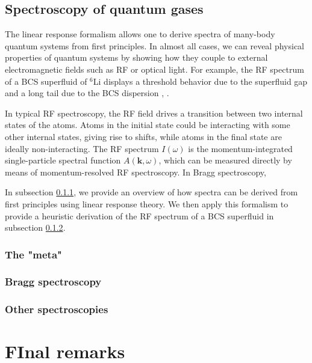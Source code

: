 \documentclass[reprint,
nofootinbib,
amsmath,amssymb,
aps]{revtex4-1}
\begin{document}
\subsection{Spectroscopy of quantum gases}\label{sec:spec}

The linear response formalism allows one to derive spectra of many-body quantum systems from first principles. In almost all cases, we can reveal physical properties of quantum systems by showing how they couple to external electromagnetic fields such as RF or optical light. For example, the RF spectrum of a BCS superfluid of $^6$Li displays a threshold behavior due to the superfluid gap and a long tail due to the BCS dispersion \cite{schirotzek2008determination}, \cite{torma2014quantum}. 

In typical RF spectroscopy, the RF field drives a transition between two internal states of the atoms. Atoms in the initial state could be interacting with some other internal states, giving rise to shifts, while atoms in the final state are ideally non-interacting. The RF spectrum $I(\omega)$ is the momentum-integrated single-particle spectral function $A(\mathbf{k}, \omega)$, which can be measured directly by means of momentum-resolved RF spectroscopy. In Bragg spectroscopy, 

In subsection \ref{sec:method}, we provide an overview of how spectra can be derived from first principles using linear response theory. We then apply this formalism to provide a heuristic derivation of the RF spectrum of a BCS superfluid in subsection \ref{sec:Bragg}. 
 
\subsubsection{The "meta"}\label{sec:method}
 
\subsubsection{Bragg spectroscopy}
\label{sec:Bragg}

\subsubsection{Other spectroscopies}




\section{FInal remarks}
\end{document}

